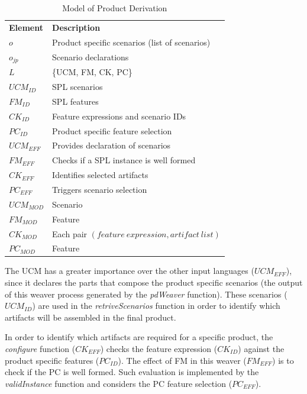 \documentclass{acm_proc_article-sp}
\begin{document}
\begin{table}[htb]
\begin{center}
\caption{Model of Product Derivation} \label{tab:pd-weaver}
\begin{tabular}{p{0.6in}p{2.4in}}
   \hline\noalign{\smallskip}
  {\bf Element} & {\bf Description} \\
   \noalign{\smallskip}
   \hline
   \noalign{\smallskip}
   $o$               & Product specific scenarios (list of scenarios) \\ 
   $o_{jp}$        & Scenario declarations \\ 
   $L$               & \{UCM, FM, CK, PC\} \\ 
   $UCM_{ID}$ & SPL scenarios \\ 
   $FM_{ID}$    & SPL features \\ 
   $CK_{ID}$    & Feature expressions and scenario IDs\\  
   $PC_{ID}$    & Product specific feature selection \\ 
   $UCM_{EFF}$ & Provides declaration of scenarios \\  
   $FM_{EFF}$    & Checks if a SPL instance is well formed \\ 
   $CK_{EFF}$    & Identifies selected artifacts  \\ 
   $PC_{EFF}$    &Triggers scenario selection \\
   $UCM_{MOD}$ & Scenario \\  
   $FM_{MOD}$   & Feature \\ 
   $CK_{MOD}$    & Each pair $(feature\ expression, artifact\ list)$  \\ 
   $PC_{MOD}$    & Feature \\
  \hline
  \end{tabular}
\end{center}
\end{table}

The UCM has a greater importance over the other input languages ($UCM_{EFF}$), since it declares the parts that compose the product specific scenarios (the 
output of this weaver process generated by the \emph{pdWeaver} function). These scenarios ($UCM_{ID}$) are used in the \emph{retriveScenarios} function in order to identify which artifacts will be assembled in the final product.     

In order to identify which artifacts are required for a specific product, the \emph{configure} function ($CK_{EFF}$) checks the feature expression ($CK_{ID}$) against the product specific features ($PC_{ID}$). The effect of FM in this weaver ($FM_{EFF}$) is to check if the PC is well formed. Such evaluation is implemented by the \emph{validInstance} function and considers the PC feature selection ($PC_{EFF}$). 
  
\end{document}
